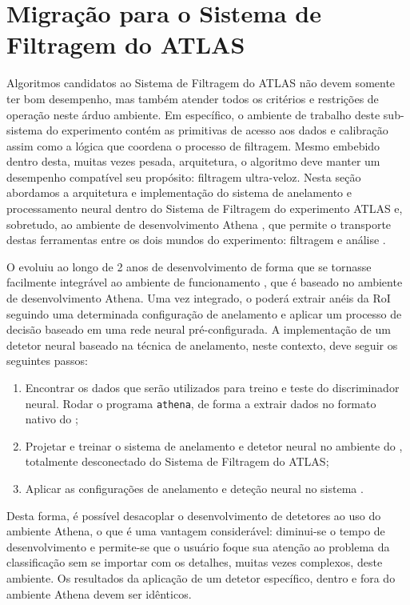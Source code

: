 \section{Migração para o Sistema de Filtragem do ATLAS}

Algoritmos candidatos ao Sistema de Filtragem do ATLAS não devem somente ter
bom desempenho, mas também atender todos os critérios e restrições de operação
neste árduo ambiente. Em específico, o ambiente de trabalho deste sub-sistema
do experimento contém as primitivas de acesso aos dados e calibração assim
como a lógica que coordena o processo de filtragem. Mesmo embebido dentro
desta, muitas vezes pesada, arquitetura, o algoritmo deve manter um desempenho
compatível seu propósito: filtragem ultra-veloz. Nesta seção abordamos a
arquitetura e implementação do sistema de anelamento e processamento neural
dentro do Sistema de Filtragem do experimento ATLAS e, sobretudo, ao ambiente
de desenvolvimento Athena \cite{athena:home-page, athena:devel-guide}, que
permite o transporte destas ferramentas entre os dois mundos do experimento:
filtragem e análise .

O  evoluiu ao longo de 2 anos de desenvolvimento de forma
que se tornasse facilmente integrável ao ambiente de funcionamento
, que é baseado no ambiente de desenvolvimento Athena. Uma vez
integrado, o  poderá extrair anéis da RoI seguindo uma
determinada configuração de anelamento e aplicar um processo de decisão
baseado em uma rede neural pré-configurada. A implementação de um detetor
neural baseado na técnica de anelamento, neste contexto, deve seguir os
seguintes passos:

\begin{enumerate}
\item Encontrar os dados que serão utilizados para treino e teste do
discriminador neural. Rodar o programa \texttt{athena}, de forma a extrair
dados no formato nativo do ;
\item Projetar e treinar o sistema de anelamento e detetor neural no ambiente
do , totalmente desconectado do Sistema de Filtragem do
ATLAS;
\item Aplicar as configurações de anelamento e deteção neural no sistema
.
\end{enumerate}

Desta forma, é possível desacoplar o desenvolvimento de detetores ao uso do
ambiente Athena, o que é uma vantagem considerável: diminui-se o tempo de
desenvolvimento e permite-se que o usuário foque sua atenção ao problema da
classificação sem se importar com os detalhes, muitas vezes complexos, deste
ambiente. Os resultados da aplicação de um detetor específico, dentro e fora
do ambiente Athena devem ser idênticos.

